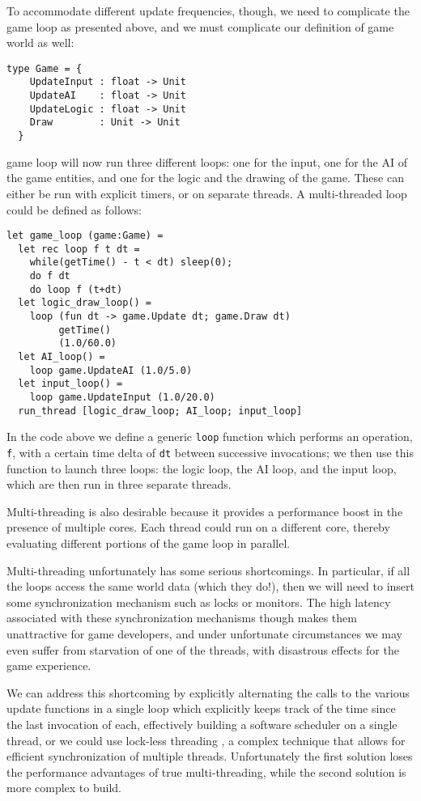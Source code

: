 To accommodate different update frequencies, though, we need to complicate the game loop as presented above, and we must complicate our definition of game world as well:

\begin{lstlisting}
type Game = {
    UpdateInput : float -> Unit
    UpdateAI    : float -> Unit
    UpdateLogic : float -> Unit
    Draw        : Unit -> Unit 
  }
\end{lstlisting}

 game loop will now run three different loops: one for the input, one for the AI of the game entities, and one for the logic and the drawing of the game. These can either be run with explicit timers, or on separate threads. A multi-threaded loop could be defined as follows:

\begin{lstlisting}
let game_loop (game:Game) = 
  let rec loop f t dt =
    while(getTime() - t < dt) sleep(0);
    do f dt
    do loop f (t+dt)
  let logic_draw_loop() = 
    loop (fun dt -> game.Update dt; game.Draw dt) 
         getTime()
         (1.0/60.0)
  let AI_loop() =
    loop game.UpdateAI (1.0/5.0)
  let input_loop() =
    loop game.UpdateInput (1.0/20.0)
  run_thread [logic_draw_loop; AI_loop; input_loop]
\end{lstlisting}

In the code above we define a generic \texttt{loop} function which performs an operation, \texttt{f}, with a certain time delta of \texttt{dt} between successive invocations; we then use this function to launch three loops: the logic loop, the AI loop, and the input loop, which are then run in three separate threads.

Multi-threading is also desirable because it provides a performance boost in the presence of multiple cores. Each thread could run on a different core, thereby evaluating different portions of the game loop in parallel.

Multi-threading unfortunately has some serious shortcomings. In particular, if all the loops access the same world data (which they do!), then we will need to insert some synchronization mechanism such as locks or monitors. The high latency associated with these synchronization mechanisms though makes them unattractive for game developers, and under unfortunate circumstances we may even suffer from starvation of one of the threads, with disastrous effects for the game experience.

We can address this shortcoming by explicitly alternating the calls to the various update functions in a single loop which explicitly keeps track of the time since the last invocation of each, effectively building a software scheduler on a single thread, or we could use lock-less threading \cite{CHAPTER_2_LOCKLESS_THREADING}, a complex technique that allows for efficient synchronization of multiple threads. Unfortunately the first solution loses the performance advantages of true multi-threading, while the second solution is more complex to build.


